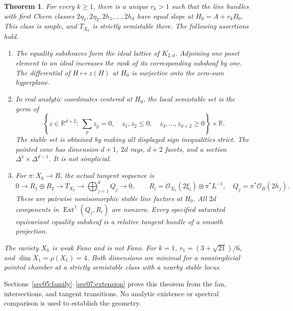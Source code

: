 \documentclass[11pt]{amsart}
\newtheorem{theorem}{Theorem}[section]
\theoremstyle{definition}
\theoremstyle{remark}
\newcommand{\RR}{\mathbb R}
\newcommand{\cO}{\mathcal O}
\newcommand{\Ext}{\operatorname{Ext}}
\begin{document}
\begin{theorem}\label{thm01:family}
For every \(k\ge1\), there is a unique \(r_k>1\) such that the line
bundles with first Chern classes
\(2\eta_1,2\eta_2,2h_1,\ldots,2h_d\) have equal slope at
\(H_0=A+r_kB_0\). This class is ample, and \(T_{X_k}\) is strictly
semistable there. The following assertions hold.
\begin{enumerate}
\item The equality subsheaves form the ideal lattice of \(K_{2,d}\).
Adjoining one poset element to an ideal increases the rank of its
corresponding subsheaf by one. The differential of \(H\mapsto z(H)\)
at \(H_0\) is surjective onto the zero-sum hyperplane.
\item In real analytic coordinates centered at \(H_0\), the local
semistable set is the germ of
\begin{equation}\label{eq01:cone}
 \left\{z\in\RR^{d+2}:\ \sum_pz_p=0,\quad
 z_1,z_2\le0,\quad z_3,\ldots,z_{d+2}\ge0\right\}\times\RR.
\end{equation}
The stable set is obtained by making all displayed sign inequalities
strict. The pointed cone has dimension \(d+1\), \(2d\) rays,
\(d+2\) facets, and a section \(\Delta^1\times\Delta^{d-1}\).
It is not simplicial.
\item For \(\pi:X_k\to B\), the actual tangent sequence is
\begin{equation}\label{eq01:extension}
 0\longrightarrow R_1\oplus R_2\longrightarrow T_{X_k}
 \longrightarrow\bigoplus_{j=1}^d Q_j\longrightarrow0,
 \qquad
 R_i=\cO_{X_k}(2\xi_i)\otimes\pi^*L^{-1},\quad
 Q_j=\pi^*\cO_B(2h_j).
\end{equation}
These are pairwise nonisomorphic stable line factors at \(H_0\).
All \(2d\) components in \(\Ext^1(Q_j,R_i)\) are nonzero.
Every specified saturated equivariant equality subsheaf is a relative
tangent bundle of a smooth projection.
\end{enumerate}
The variety \(X_k\) is weak Fano and is not Fano. For \(k=1\),
\(r_1=(3+\sqrt{21})/6\), and \(\dim X_1=\rho(X_1)=4\).
Both dimensions are minimal for a nonsimplicial pointed chamber at a
strictly semistable class with a nearby stable locus.
\end{theorem}

Sections~\ref{sec05:family}--\ref{sec07:extension} prove this theorem
from the fan, intersections, and tangent transitions. No analytic
existence or spectral comparison is used to establish the geometry.
\end{document}
